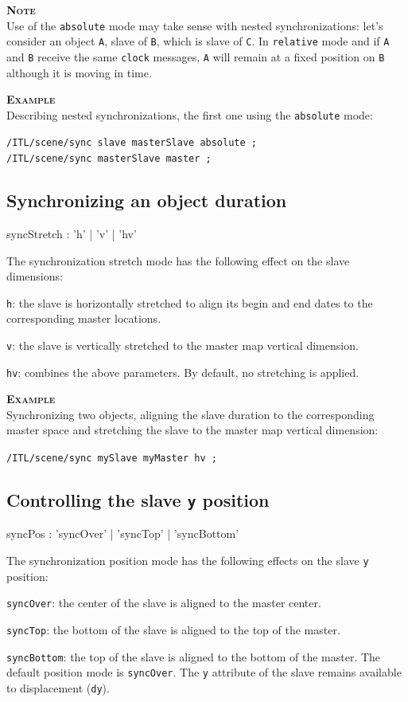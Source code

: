 \documentclass[a4paper,twoside]{report}
\newcommand{\subsublevel}[1]	{\subsection{#1}}
\newcommand{\OSC}[1]		{\texttt{#1}}
\newcommand{\values}[1]		{\texttt{#1}}
\newcommand{\example}		{\textbf{\hspace{-1.5cm}\textbf{\textsc{Example }}}}
\newcommand{\note}	[1]		{\vspace{2mm}\textbf{\hspace{-0.9cm}\textbf{\textsc{Note #1}}}}
\let\olditemize\itemize
\let\oldenditemize\enditemize
\renewenvironment{itemize} 	{\olditemize \setlength{\itemsep}{1mm}}{\oldenditemize}
\newcommand{\sample}	[1]			{\vspace{-2mm}\begin{center}\colorbox{mygrey}{
								\begin{minipage}[t]{0.9\columnwidth} 
								{\small \texttt{#1}}
								\end{minipage}}\end{center}}
\begin{document}
\note{} \\
Use of the \OSC{absolute} mode may take sense with nested synchronizations: let's consider an object \values{A}, slave of \values{B}, which is slave of \values{C}.
In \OSC{relative} mode and if \values{A} and \values{B} receive the same \OSC{clock} messages, \values{A} will remain at a fixed position on \values{B} although it is moving in time.

\example \\
Describing nested synchronizations, the first one using the \OSC{absolute} mode:
\sample{/ITL/scene/sync slave masterSlave absolute ;\\
/ITL/scene/sync masterSlave master ;
}

\subsublevel{Synchronizing an object duration}

\begin{rail}
syncStretch : 'h' | 'v' | 'hv'
\end{rail}

The synchronization stretch mode has the following effect on the slave dimensions:
\begin{itemize}
\item \OSC{h}: the slave is horizontally stretched to align its begin and end dates to the corresponding master locations.
\item \OSC{v}: the slave is vertically stretched to the master map vertical dimension.
\item \OSC{hv}: combines the above parameters.
\end{itemize}
By default, no stretching is applied.

\example \\
Synchronizing two objects, aligning the slave duration to the corresponding master space and stretching the slave to the master map vertical dimension:
\sample{/ITL/scene/sync mySlave myMaster hv ;}


\subsublevel{Controlling the slave \OSC{y} position}

\begin{rail}
syncPos : 'syncOver' | 'syncTop' | 'syncBottom'
\end{rail}

The synchronization position mode has the following effects on the slave \values{y} position:
\begin{itemize}
\item \OSC{syncOver}: the center of the slave is aligned to the master center.
\item \OSC{syncTop}: the bottom of the slave is aligned to the top of the master.
\item \OSC{syncBottom}: the top of the slave is aligned to the bottom of the master.
\end{itemize}
The default position mode is \OSC{syncOver}. The \OSC{y} attribute of the slave remains available to displacement (\OSC{dy}). 
\end{document}
